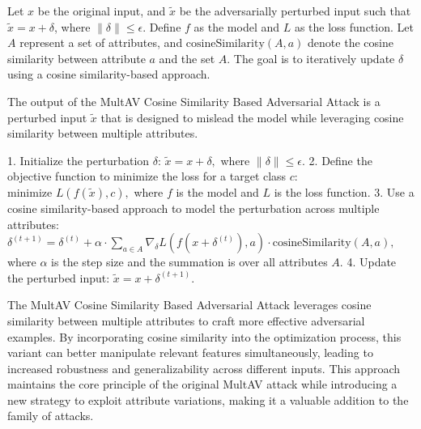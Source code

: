 Let \( x \) be the original input, and \( \tilde{x} \) be the adversarially perturbed input such that \( \tilde{x} = x + \delta \), where \( \|\delta\| \leq \epsilon \). Define \( f \) as the model and \( L \) as the loss function. Let \( A \) represent a set of attributes, and \( \text{cosineSimilarity}(A, a) \) denote the cosine similarity between attribute \( a \) and the set \( A \). The goal is to iteratively update \( \delta \) using a cosine similarity-based approach.


The output of the MultAV Cosine Similarity Based Adversarial Attack is a perturbed input \(\tilde{x}\) that is designed to mislead the model while leveraging cosine similarity between multiple attributes.

1. Initialize the perturbation \(\delta\):
   $
   \tilde{x} = x + \delta,
   $
   where \( \|\delta\| \leq \epsilon \).
2. Define the objective function to minimize the loss for a target class \( c \):
   $
   \text{minimize } L(f(\tilde{x}), c),
   $
   where \( f \) is the model and \( L \) is the loss function.
3. Use a cosine similarity-based approach to model the perturbation across multiple attributes:
   $
   \delta^{(t+1)} = \delta^{(t)} + \alpha \cdot \sum_{a \in A} \nabla_{\delta} L(f(x + \delta^{(t)}), a) \cdot \text{cosineSimilarity}(A, a),
   $
   where \( \alpha \) is the step size and the summation is over all attributes \( A \).
4. Update the perturbed input:
   $
   \tilde{x} = x + \delta^{(t+1)}.
   $

The MultAV Cosine Similarity Based Adversarial Attack leverages cosine similarity between multiple attributes to craft more effective adversarial examples. By incorporating cosine similarity into the optimization process, this variant can better manipulate relevant features simultaneously, leading to increased robustness and generalizability across different inputs. This approach maintains the core principle of the original MultAV attack while introducing a new strategy to exploit attribute variations, making it a valuable addition to the family of attacks.